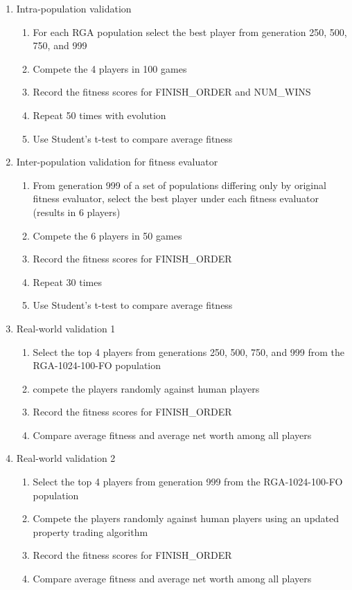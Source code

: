 \begin{enumerate} 
  \item {Intra-population validation}
  \begin{enumerate}
    \item {For each RGA population select the best player from generation 250,
    500, 750, and 999}
    \item {Compete the 4 players in 100 games}
    \item {Record the fitness scores for FINISH\_ORDER and NUM\_WINS}
    \item {Repeat 50 times with evolution}
    \item {Use Student's t-test to compare average fitness}
  \end{enumerate}
  \item {Inter-population validation for fitness evaluator}
  \begin{enumerate} 
    \item {From generation 999 of a set of populations differing only by
    original fitness evaluator, select the best player under each fitness
    evaluator (results in 6 players)} 
    \item {Compete the 6 players in 50 games}
    \item {Record the fitness scores for FINISH\_ORDER}
    \item {Repeat 30 times}
    \item {Use Student's t-test to compare average fitness}
  \end {enumerate}
  \item {Real-world validation 1}
  \begin{enumerate} 
    \item {Select the top 4 players from generations 250, 500, 750, and 999 from
    the RGA-1024-100-FO population}
    \item {compete the players randomly against human players}
    \item {Record the fitness scores for FINISH\_ORDER}
    \item {Compare average fitness and average net worth among all players}
  \end {enumerate}
  \item {Real-world validation 2}
  \begin{enumerate} 
    \item {Select the top 4 players from generation 999 from the RGA-1024-100-FO 
    population}
    \item {Compete the players randomly against human players using an updated 
    property trading algorithm}
    \item {Record the fitness scores for FINISH\_ORDER}
    \item {Compare average fitness and average net worth among all players}
  \end {enumerate}
\end{enumerate}

